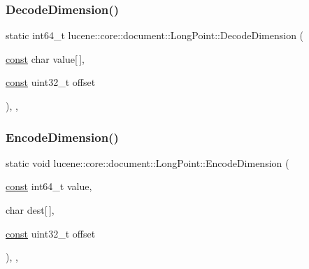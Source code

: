\subsubsection{\texorpdfstring{Decode\+Dimension()}{DecodeDimension()}}
{\footnotesize\ttfamily static int64\+\_\+t lucene\+::core\+::document\+::\+Long\+Point\+::\+Decode\+Dimension (\begin{DoxyParamCaption}\item[{\mbox{\hyperlink{ZlibCrc32_8h_a2c212835823e3c54a8ab6d95c652660e}{const}} char}]{value\mbox{[}$\,$\mbox{]},  }\item[{\mbox{\hyperlink{ZlibCrc32_8h_a2c212835823e3c54a8ab6d95c652660e}{const}} uint32\+\_\+t}]{offset }\end{DoxyParamCaption})\hspace{0.3cm}{\ttfamily [inline]}, {\ttfamily [static]}, {\ttfamily [noexcept]}}

\mbox{\label{classlucene_1_1core_1_1document_1_1LongPoint_a80f6cff17fd7eb5d8664650dda0174b0}} 
\subsubsection{\texorpdfstring{Encode\+Dimension()}{EncodeDimension()}}
{\footnotesize\ttfamily static void lucene\+::core\+::document\+::\+Long\+Point\+::\+Encode\+Dimension (\begin{DoxyParamCaption}\item[{\mbox{\hyperlink{ZlibCrc32_8h_a2c212835823e3c54a8ab6d95c652660e}{const}} int64\+\_\+t}]{value,  }\item[{char}]{dest\mbox{[}$\,$\mbox{]},  }\item[{\mbox{\hyperlink{ZlibCrc32_8h_a2c212835823e3c54a8ab6d95c652660e}{const}} uint32\+\_\+t}]{offset }\end{DoxyParamCaption})\hspace{0.3cm}{\ttfamily [inline]}, {\ttfamily [static]}, {\ttfamily [noexcept]}}

\mbox{\label{classlucene_1_1core_1_1document_1_1LongPoint_a5c411f51ac0f3dbce1df139d3a4c1973}} 
